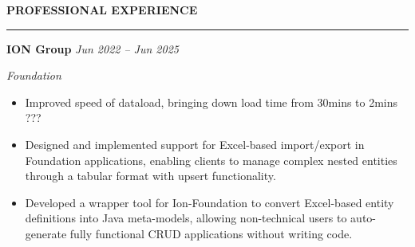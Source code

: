 \documentclass[a4paper,10pt]{article}
\newcommand{\cvHeaderOne}[1]{%
  \vspace*{1.5em}%
  {\noindent\large\textbf{\MakeUppercase{#1}}\par}%
  \noindent\rule{\linewidth}{0.4pt}%
  \vspace*{0.5em}%
}
\newcommand{\cvHeaderTwo}[2]{%
  \vspace{0.8em}%
  \noindent\textbf{\normalsize #1} \hfill \textit{#2}\par%
}
\newcommand{\cvHeaderThree}[1]{%
  \noindent\textit{#1}%
}
\newenvironment{cvItemList}{%
  \begin{itemize}%
    \setlength{\itemsep}{0.1em}%
    \setlength{\topsep}{0em}%
    \setlength{\partopsep}{0em}%
    \setlength{\parsep}{0em}%
    \setlength{\parskip}{0em}%
}{%
  \end{itemize}%
}
\begin{document}
\cvHeaderOne{Professional Experience}

\cvHeaderTwo{ION Group}{Jun 2022 -- Jun 2025}

\cvHeaderThree{Foundation}

\begin{cvItemList}
  \item Improved speed of dataload, bringing down load time from 30mins to 2mins  ???
  \item Designed and implemented support for Excel-based import/export in Foundation applications, enabling clients to manage complex nested entities through a tabular format with upsert functionality. 
  \item Developed a wrapper tool for Ion-Foundation to convert Excel-based entity definitions into Java meta-models, allowing non-technical users to auto-generate fully functional CRUD applications without writing code. 
\end{cvItemList}
\end{document}

